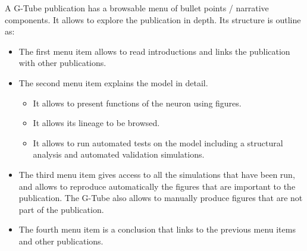 \documentclass[12pt]{article}
\begin{document}
A G-Tube publication has a browsable menu of bullet points / narrative
components.  It allows to explore the publication in depth.  Its
structure is outline as:

\begin{itemize}
\item The first menu item allows to read introductions and links the
  publication with other publications.
\item The second menu item explains the model in detail.
  \begin{itemize}
  \item It allows to present functions of the neuron using figures.
  \item It allows its lineage to be browsed.
  \item It allows to run automated tests on the model including a
    structural analysis and automated validation simulations.
  \end{itemize}
\item The third menu item gives access to all the simulations that
  have been run, and allows to reproduce automatically the figures
  that are important to the publication.  The G-Tube also allows to
  manually produce figures that are not part of the publication.
\item The fourth menu item is a conclusion that links to the previous
  menu items and other publications.
\end{itemize}



\end{document}
